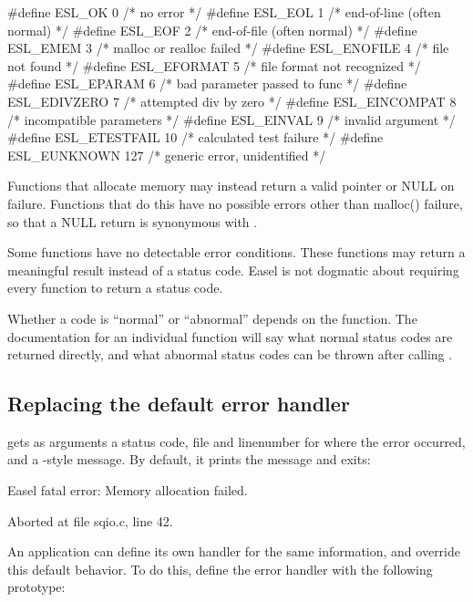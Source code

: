 \documentclass[11pt]{article}
\begin{document}
\begin{cchunk}
#define ESL_OK         0	/* no error                     */
#define ESL_EOL        1	/* end-of-line (often normal)   */
#define ESL_EOF        2	/* end-of-file (often normal)   */
#define ESL_EMEM       3	/* malloc or realloc failed     */
#define ESL_ENOFILE    4	/* file not found               */
#define ESL_EFORMAT    5	/* file format not recognized   */
#define ESL_EPARAM     6	/* bad parameter passed to func */
#define ESL_EDIVZERO   7	/* attempted div by zero        */
#define ESL_EINCOMPAT  8	/* incompatible parameters      */
#define ESL_EINVAL     9	/* invalid argument             */
#define ESL_ETESTFAIL  10	/* calculated test failure      */
#define ESL_EUNKNOWN   127      /* generic error, unidentified  */
\end{cchunk}

Functions that allocate memory may instead return a valid pointer or
NULL on failure. Functions that do this have no possible errors other
than malloc() failure, so that a NULL return is synonymous with
.

Some functions have no detectable error conditions. These functions
may return a meaningful result instead of a status code. Easel is not
dogmatic about requiring every function to return a status code.

Whether a code is ``normal'' or ``abnormal'' depends on the function.
The documentation for an individual function will say what normal
status codes are returned directly, and what abnormal status codes can
be thrown after calling .

\subsection{Replacing the default error handler}

 gets as arguments a status code, file and
linenumber for where the error occurred, and a -style
message. By default, it prints the message and exits:

\begin{cchunk}
Easel fatal error:
Memory allocation failed.

Aborted at file sqio.c, line 42. 
\end{cchunk}

An application can define its own handler for the same information,
and override this default behavior. To do this, define the error
handler with the following prototype:
\end{document}
